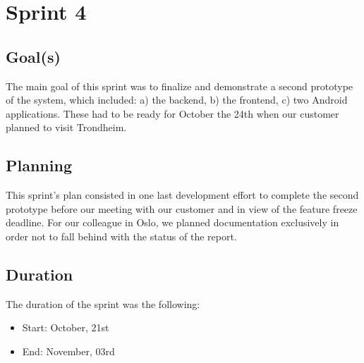 
\chapter{Sprint 4}
\label{Sprint4}

\section{Goal(s)}

The main goal of this sprint was to finalize and demonstrate a second prototype of the system,
which included: a) the backend, b) the frontend, c) two Android applications.
These had to be ready for October the 24th when our customer planned to visit Trondheim.

\section{Planning}

This sprint's plan consisted in one last development effort to complete the second prototype
before our meeting with our customer and in view of the feature freeze deadline.
For our colleague in Oslo, we planned documentation exclusively in order
not to fall behind with the status of the report.

\section{Duration}
The duration of the sprint was the following:
\begin{itemize}
\item Start: October, 21st
\item End: November, 03rd
\end{itemize}

